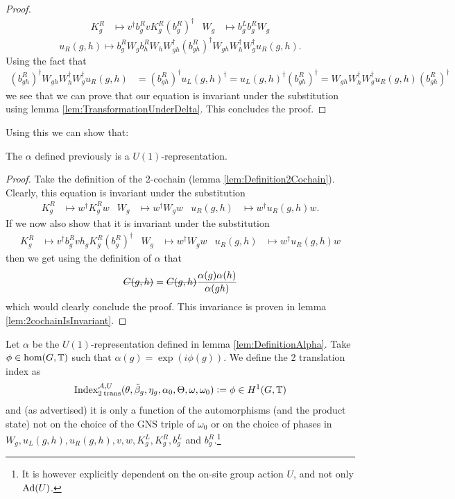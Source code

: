 \documentclass[11pt,a4paper,twoside]{article}
\numberwithin{equation}{section}
\begin{document}
\begin{proof}
		\begin{align}
			K_g^R&\mapsto v^\dagger b_g^R v K_g^R (b_g^R)^\dagger&W_g&\mapsto b_g^Lb_g^RW_g
		\end{align}
		\begin{equation}
			u_R(g,h)\mapsto b_g^R W_g b_h^R W_h W_{gh}^\dagger (b_{gh}^R)^\dagger W_{gh}W_h^\dagger W_g^\dagger u_R(g,h).
		\end{equation}
		Using the fact that
		\begin{align}
			(b_{gh}^R)^\dagger W_{gh}W_h^\dagger W_g^\dagger u_R(g,h)&=(b_{gh}^R)^\dagger u_L(g,h)^\dagger=u_L(g,h)^\dagger(b_{gh}^R)^\dagger=W_{gh}W_h^\dagger W_g^\dagger u_R(g,h) (b_{gh}^R)^\dagger
		\end{align}
		we see that we can prove that our equation is invariant under the substitution using lemma \ref{lem:TransformationUnderDelta}. This concludes the proof.
	\end{proof}
	Using this we can show that:
	\begin{lemma}
		The $\alpha$ defined previously is a $U(1)$-representation.
	\end{lemma}
	\begin{proof}
		Take the definition of the 2-cochain (lemma \ref{lem:Definition2Cochain}). Clearly, this equation is invariant under the substitution
		\begin{align}
			K_g^R&\mapsto w^\dagger K_g^R w&W_g&\mapsto w^\dagger W_g w&u_R(g,h)&\mapsto w^\dagger u_R(g,h)w.
		\end{align}
		If we now also show that it is invariant under the substitution
		\begin{align}
			K_g^R&\mapsto v^\dagger b_g^R v h_g K_g^R (b_g^R)^\dagger&W_g&\mapsto w^\dagger W_g w&u_R(g,h)&\mapsto w^\dagger u_R(g,h)w
		\end{align}
		then we get using the definition of $\alpha$ that
		\begin{equation}
			\stkout{C(g,h)}=\stkout{C(g,h)}\frac{\alpha(g)\alpha(h)}{\alpha(gh)}
		\end{equation}
		which would clearly conclude the proof. This invariance is proven in lemma \ref{lem:2cochainIsInvariant}.
	\end{proof}
	\begin{definition}\label{def:DefinitionOfTheH1ValuedIndex}
		Let $\alpha$ be the $U(1)$-representation defined in lemma \ref{lem:DefinitionAlpha}. Take $\phi\in\hom(G,\mathbb T)$ such that $\alpha(g)=\exp(i\phi(g))$. We define the 2 translation index as
		\begin{equation}
			\textrm{Index}_{2\:\text{trans}}^{\mathcal A,U}(\theta,\tilde{\beta}_g,\eta_g,\alpha_0,\Theta,\omega,\omega_0)\vcentcolon= \phi\in H^1(G,\mathbb T)
		\end{equation}
		and (as advertised) it is only a function of the automorphisms (and the product state) not on the choice of the GNS triple of $\omega_0$ or on the choice of phases in $W_g,u_L(g,h),u_R(g,h),v,w,K^L_g,K^R_g,b^L_g$ and $b^R_g$.\footnote{It is however explicitly dependent on the on-site group action $U$, and not only $\Ad{U}$.}
	\end{definition}
\end{document}
